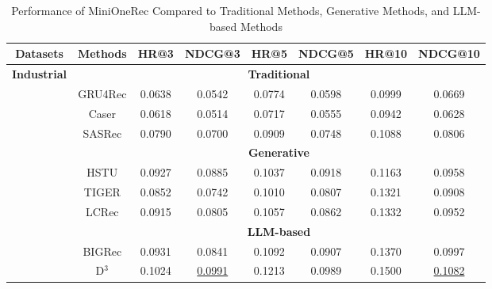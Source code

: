\begin{table}[t]
\caption{Performance of MiniOneRec Compared to Traditional Methods, Generative Methods, and LLM-based Methods} 
\label{tab:overall}
\centering
\begin{adjustbox}{max width=0.9\textwidth}
\renewcommand{\arraystretch}{1.00}
\begin{tabular}{cccccccc}
\toprule
\multicolumn{1}{c}{Datasets}            & Methods    & HR@3   & NDCG@3 & HR@5   & NDCG@5 & HR@10  & NDCG@10 \\ \midrule
\multirow{14}{*}{\textbf{Industrial}} & \multicolumn{7}{c}{\textbf{Traditional}}                          \\ \cmidrule(lr){2-8} 
                                      & GRU4Rec    & 0.0638 & 0.0542 & 0.0774 & 0.0598 & 0.0999 & 0.0669  \\
                                      & Caser      & 0.0618 & 0.0514 & 0.0717 & 0.0555 & 0.0942 & 0.0628  \\
                                      & SASRec     & 0.0790 & 0.0700 & 0.0909 & 0.0748 & 0.1088 & 0.0806  \\ \cmidrule(lr){2-8}
                                      & \multicolumn{7}{c}{\textbf{Generative}}                           \\ \cmidrule(lr){2-8}
                                      & HSTU       & 0.0927 & 0.0885 & 0.1037 & 0.0918 & 0.1163 & 0.0958  \\
                                      & TIGER      & 0.0852 & 0.0742 & 0.1010 & 0.0807 & 0.1321 & 0.0908  \\
                                      & LCRec      & 0.0915 & 0.0805 & 0.1057 & 0.0862 & 0.1332 & 0.0952  \\ \cmidrule(lr){2-8}
                                      & \multicolumn{7}{c}{\textbf{LLM-based}}                            \\ \cmidrule(lr){2-8}
                                      & BIGRec     & 0.0931 & 0.0841 & 0.1092 & 0.0907 & 0.1370 & 0.0997  \\
                                      & D$^3$         & 0.1024 & \uline{0.0991} & 0.1213 & 0.0989 & 0.1500 & \uline{0.1082} \\

\end{tabular}
\end{adjustbox}
\end{table}
